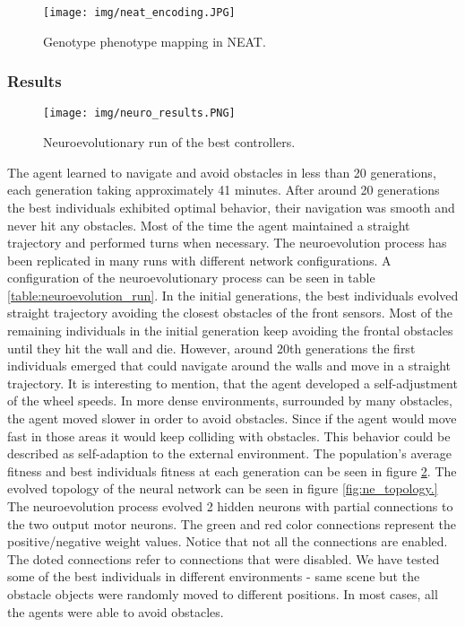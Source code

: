 \documentclass[format=acmsmall, review=false, screen=true]{acmart}
\begin{document}
\begin{figure}[H]
  \texttt{[image: img/neat\_encoding.JPG]}
  \caption{Genotype phenotype mapping in NEAT.}
  \label{fig:encoding}
\end{figure}

\subsubsection{Results}

\begin{figure}[H]
  \texttt{[image: img/neuro\_results.PNG]}
  \caption{Neuroevolutionary run of the best controllers.}
  \label{fig:ne_results}
\end{figure}

The agent learned to navigate and avoid obstacles in less than 20 generations, each generation taking approximately 41 minutes. After around 20 generations the best individuals exhibited optimal behavior, their navigation was smooth and never hit any obstacles. Most of the time the agent maintained a straight trajectory and performed turns when necessary. The neuroevolution process has been replicated in many runs with different network configurations. A configuration of the neuroevolutionary process can be seen in table \ref{table:neuroevolution_run}. In the initial generations, the best individuals evolved straight trajectory avoiding the closest obstacles of the front sensors. Most of the remaining individuals in the initial generation keep avoiding the frontal obstacles until they hit the wall and die. However, around 20th generations the first individuals emerged that could navigate around the walls and move in a straight trajectory. It is interesting to mention, that the agent developed a self-adjustment of the wheel speeds. In more dense environments, surrounded by many obstacles, the agent moved slower in order to avoid obstacles. Since if the agent would move fast in those areas it would keep colliding with obstacles. This behavior could be described as self-adaption to the external environment. The population's average fitness and best individuals fitness at each generation can be seen in figure \ref{fig:ne_results}. The evolved topology of the neural network can be seen in figure \ref{fig:ne_topology.} The neuroevolution process evolved 2 hidden neurons with partial connections to the two output motor neurons. The green and red color connections represent the positive/negative weight values. Notice that not all the connections are enabled. The doted connections refer to connections that were disabled. We have tested some of the best individuals in different environments - same scene but the obstacle objects were randomly moved to different positions. In most cases, all the agents were able to avoid obstacles.
\end{document}
